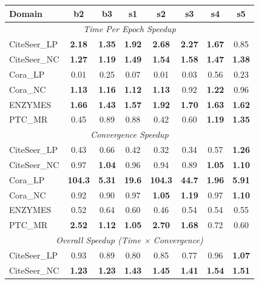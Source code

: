 \documentclass[11pt]{article}
\begin{document}
\begin{table}[t]
\centering
\footnotesize
\setlength{\tabcolsep}{2.8pt}
\renewcommand{\arraystretch}{1.05}
\begin{tabular}{l c c c c c c c}
\toprule
\textbf{Domain} & \textbf{b2} & \textbf{b3} & \textbf{s1} & \textbf{s2} & \textbf{s3} & \textbf{s4} & \textbf{s5} \\
\midrule
\multicolumn{8}{c}{\textit{Time Per Epoch Speedup}} \\
CiteSeer\_LP & \textbf{2.18} & \textbf{1.35} & \textbf{1.92} & \textbf{2.68} & \textbf{2.27} & \textbf{1.67} & 0.85 \\
CiteSeer\_NC & \textbf{1.27} & \textbf{1.19} & \textbf{1.49} & \textbf{1.54} & \textbf{1.58} & \textbf{1.47} & \textbf{1.38} \\
Cora\_LP & 0.01 & 0.25 & 0.07 & 0.01 & 0.03 & 0.56 & 0.23 \\
Cora\_NC & \textbf{1.13} & \textbf{1.16} & \textbf{1.12} & \textbf{1.13} & 0.92 & \textbf{1.22} & 0.96 \\
ENZYMES & \textbf{1.66} & \textbf{1.43} & \textbf{1.57} & \textbf{1.92} & \textbf{1.70} & \textbf{1.63} & \textbf{1.62} \\
PTC\_MR & 0.45 & 0.89 & 0.88 & 0.42 & 0.60 & \textbf{1.19} & \textbf{1.35} \\
\midrule
\multicolumn{8}{c}{\textit{Convergence Speedup}} \\
CiteSeer\_LP & 0.43 & 0.66 & 0.42 & 0.32 & 0.34 & 0.57 & \textbf{1.26} \\
CiteSeer\_NC & 0.97 & \textbf{1.04} & 0.96 & 0.94 & 0.89 & \textbf{1.05} & \textbf{1.10} \\
Cora\_LP & \textbf{104.3} & \textbf{5.31} & \textbf{19.6} & \textbf{104.3} & \textbf{44.7} & \textbf{1.96} & \textbf{5.91} \\
Cora\_NC & 0.92 & 0.90 & 0.97 & \textbf{1.05} & \textbf{1.19} & 0.97 & \textbf{1.10} \\
ENZYMES & 0.52 & 0.64 & 0.60 & 0.46 & 0.54 & 0.54 & 0.55 \\
PTC\_MR & \textbf{2.52} & \textbf{1.12} & \textbf{1.05} & \textbf{2.70} & \textbf{1.68} & 0.72 & 0.60 \\
\midrule
\multicolumn{8}{c}{\textit{Overall Speedup (Time × Convergence)}} \\
CiteSeer\_LP & 0.93 & 0.89 & 0.80 & 0.85 & 0.77 & 0.96 & \textbf{1.07} \\
CiteSeer\_NC & \textbf{1.23} & \textbf{1.23} & \textbf{1.43} & \textbf{1.45} & \textbf{1.41} & \textbf{1.54} & \textbf{1.51} \\

\end{tabular}
\end{table}
\end{document}
